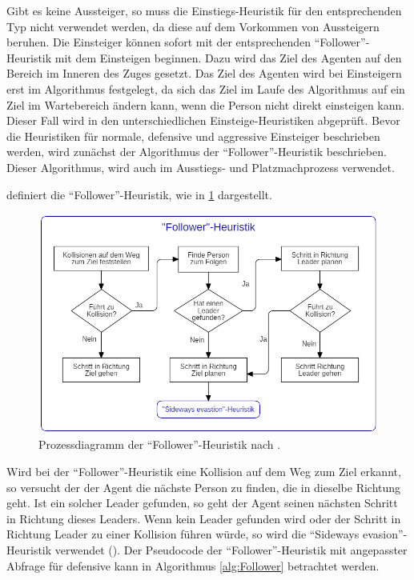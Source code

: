 Gibt es keine Aussteiger, so muss die Einstiegs-Heuristik für den entsprechenden Typ nicht verwendet werden, da diese auf dem Vorkommen von Aussteigern beruhen. Die Einsteiger können sofort mit der entsprechenden "`Follower"'-Heuristik mit dem Einsteigen beginnen. Dazu wird das Ziel des Agenten auf den Bereich im Inneren des Zuges gesetzt. Das Ziel des Agenten wird bei Einsteigern erst im Algorithmus festgelegt, da sich das Ziel im Laufe des Algorithmus auf ein Ziel im Wartebereich ändern kann, wenn die Person nicht direkt einsteigen kann. Dieser Fall wird in den unterschiedlichen Einsteige-Heuristiken abgeprüft. Bevor die Heuristiken für normale, defensive und aggressive Einsteiger beschrieben werden, wird zunächst der Algorithmus der "`Follower"'-Heuristik beschrieben. Dieser Algorithmus, wird auch im Ausstiegs- und Platzmachprozess verwendet.

\cite{Seitz.2016} definiert die "`Follower"'-Heuristik, wie in \figurename \ref{fig:followerHeuristik} dargestellt.
\begin{figure}[H]
	\centering
		\includegraphics[width=1.0\textwidth]{pictures/model/algorithm/heuristics/follower_heuristic.png}
	\caption{Prozessdiagramm der "`Follower"'-Heuristik nach \cite{Seitz.2016}.}
	\label{fig:followerHeuristik}
\end{figure}
Wird bei der "`Follower"'-Heuristik eine Kollision auf dem Weg zum Ziel erkannt, so versucht der der Agent die nächste Person zu finden, die in dieselbe Richtung geht. Ist ein solcher Leader gefunden, so geht der Agent seinen nächsten Schritt in Richtung dieses Leaders. Wenn kein Leader gefunden wird oder der Schritt in Richtung Leader zu einer Kollision führen würde, so wird die "`Sideways evasion"'-Heuristik verwendet (\cite{Seitz.2016}). Der Pseudocode der "`Follower"'-Heuristik mit angepasster Abfrage für defensive kann in Algorithmus \ref{alg:Follower} betrachtet werden.

